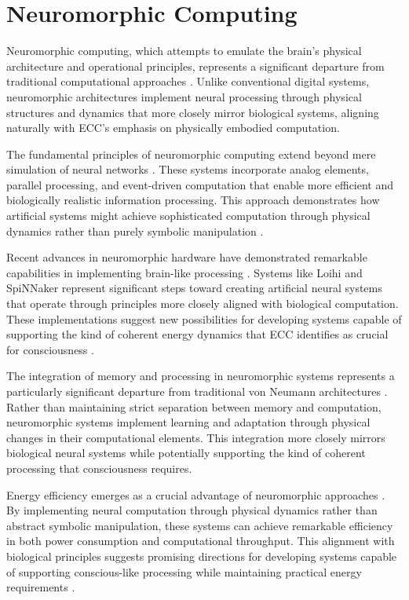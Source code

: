 \section{Neuromorphic Computing}

Neuromorphic computing, which attempts to emulate the brain's physical architecture and operational principles, represents a significant departure from traditional computational approaches \cite{Adamatzky2020a}. Unlike conventional digital systems, neuromorphic architectures implement neural processing through physical structures and dynamics that more closely mirror biological systems, aligning naturally with ECC's emphasis on physically embodied computation.

The fundamental principles of neuromorphic computing extend beyond mere simulation of neural networks \cite{Benjamin2019}. These systems incorporate analog elements, parallel processing, and event-driven computation that enable more efficient and biologically realistic information processing. This approach demonstrates how artificial systems might achieve sophisticated computation through physical dynamics rather than purely symbolic manipulation \cite{Boahen2021}.

Recent advances in neuromorphic hardware have demonstrated remarkable capabilities in implementing brain-like processing \cite{Davies2018}. Systems like Loihi and SpiNNaker represent significant steps toward creating artificial neural systems that operate through principles more closely aligned with biological computation. These implementations suggest new possibilities for developing systems capable of supporting the kind of coherent energy dynamics that ECC identifies as crucial for consciousness \cite{Furber2017}.

The integration of memory and processing in neuromorphic systems represents a particularly significant departure from traditional von Neumann architectures \cite{Indiveri2020}. Rather than maintaining strict separation between memory and computation, neuromorphic systems implement learning and adaptation through physical changes in their computational elements. This integration more closely mirrors biological neural systems while potentially supporting the kind of coherent processing that consciousness requires.

Energy efficiency emerges as a crucial advantage of neuromorphic approaches \cite{Markovic2020}. By implementing neural computation through physical dynamics rather than abstract symbolic manipulation, these systems can achieve remarkable efficiency in both power consumption and computational throughput. This alignment with biological principles suggests promising directions for developing systems capable of supporting conscious-like processing while maintaining practical energy requirements \cite{Merolla2019}.


